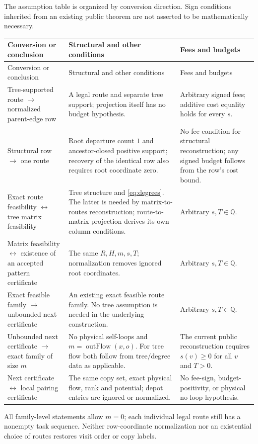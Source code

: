 \documentclass[11pt]{article}
\theoremstyle{remark}
\newcommand{\Q}{\mathbb Q}
\begin{document}
The assumption table is organized by conversion direction. Sign conditions inherited from an existing public theorem are not asserted to be mathematically necessary.
\small
\begin{longtable}{@{}p{}p{}p{}@{}}
\toprule
Conversion or conclusion & Structural and other conditions & Fees and budgets\\
\midrule
\endfirsthead
\toprule Conversion or conclusion & Structural and other conditions & Fees and budgets\\\midrule
\endhead
Tree-supported route $\longrightarrow$ normalized parent-edge row &
A legal route and separate tree support; projection itself has no budget hypothesis. &
Arbitrary signed fees; additive cost equality holds for every $s$.\\[4pt]
Structural row $\longrightarrow$ one route &
Root departure count $1$ and ancestor-closed positive support; recovery of the identical row also requires root coordinate zero. &
No fee condition for structural reconstruction; any signed budget follows from the row's cost bound.\\[4pt]
Exact route feasibility $\longleftrightarrow$ tree matrix feasibility &
Tree structure and \eqref{eq:degrees}. The latter is needed by matrix-to-routes reconstruction; route-to-matrix projection derives its own column conditions. &
Arbitrary $s,T\in\Q$.\\[4pt]
Matrix feasibility $\longleftrightarrow$ existence of an accepted pattern certificate &
The same $R,H,m,s,T$; normalization removes ignored root coordinates. &
Arbitrary $s,T\in\Q$.\\[4pt]
Exact feasible family $\longrightarrow$ unbounded next certificate &
An existing exact feasible route family. No tree assumption is needed in the underlying construction. &
Arbitrary $s,T\in\Q$.\\[4pt]
Unbounded next certificate $\longrightarrow$ exact family of size $m$ &
No physical self-loops and $m=\operatorname{outFlow}(x,o)$. For tree flow both follow from tree/degree data as applicable. &
The current public reconstruction requires $s(v)\geq0$ for all $v$ and $T>0$.\\[4pt]
Next certificate $\longleftrightarrow$ local pairing certificate &
The same copy set, exact physical flow, rank and potential; depot entries are ignored or normalized. &
No fee-sign, budget-positivity, or physical no-loop hypothesis.\\
\bottomrule
\end{longtable}
\normalsize
All family-level statements allow $m=0$; each individual legal route still has a nonempty task sequence.
Neither row-coordinate normalization nor an existential choice of routes restores visit order or copy labels.
\end{document}
